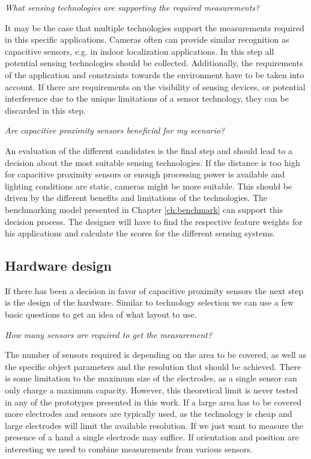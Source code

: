 \textit{What sensing technologies are supporting the required measurements?}

It may be the case that multiple technologies support the measurements required in this specific applications. Cameras often can provide similar recognition as capacitive sensors, e.g. in indoor localization applications. In this step all potential sensing technologies should be collected. Additionally, the requirements of the application and constraints towards the environment have to be taken into account. If there are requirements on the visibility of sensing devices, or potential interference due to the unique limitations of a sensor technology, they can be discarded in this step.

\textit{Are capacitive proximity sensors beneficial for my scenario?}

An evaluation of the different candidates is the final step and should lead to a decision about the most suitable sensing technologies. If the distance is too high for capacitive proximity sensors or enough processing power is available and lighting conditions are static, cameras might be more suitable. This should be driven by the different benefits and limitations of the technologies. The benchmarking model presented in Chapter \ref{ch:benchmark} can support this decision process. The designer will have to find the respective feature weights for his applications and calculate the scores for the different sensing systems.

\subsection{Hardware design}
If there has been a decision in favor of capacitive proximity sensors the next step is the design of the hardware.  Similar to technology selection we can use a few basic questions to get an idea of what layout to use.

\textit{How many sensors are required to get the measurement?}

The number of sensors required is depending on the area to be covered, as well as the specific object parameters and the resolution that should be achieved. There is some limitation to the maximum size of the electrodes, as a single sensor can only charge a maximum capacity. However, this theoretical limit is never tested in any of the prototypes presented in this work. If a large area has to be covered more electrodes and sensors are typically used, as the technology is cheap and large electrodes will limit the available resolution. If we just want to measure the presence of a hand a single electrode may suffice. If orientation and position are interesting we need to combine measurements from various sensors. 

